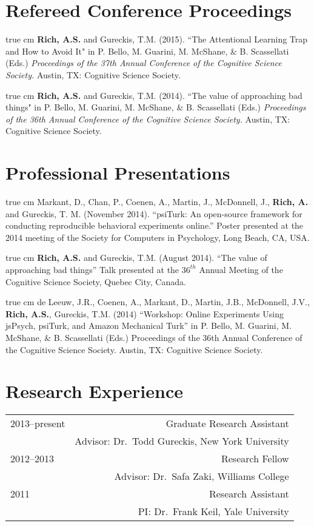 \documentclass[12pt]{my_cv}
\def\ind{\hangindent=1 true cm\hangafter=1 \noindent}
\begin{document}
\section{Refereed Conference Proceedings}

\ind \textbf{Rich, A.S.} and Gureckis, T.M. (2015). ``The Attentional Learning Trap and How to Avoid It" in P. Bello, M. Guarini, M. McShane, \& B. Scassellati (Eds.) \emph{Proceedings of the 37th Annual Conference of the Cognitive Science Society.} Austin, TX: Cognitive Science Society.	

\ind \textbf{Rich, A.S.} and Gureckis, T.M. (2014). ``The value of approaching bad things" in P. Bello, M. Guarini, M. McShane, \& B. Scassellati (Eds.) \emph{Proceedings of the 36th Annual Conference of the Cognitive Science Society.} Austin, TX: Cognitive Science Society.	

\section{Professional Presentations}
\ind Markant, D., Chan, P., Coenen, A., Martin, J., McDonnell, J., \textbf{Rich, A.} and Gureckis, T. M. (November 2014). ``psiTurk: An open-source framework for conducting reproducible behavioral experiments online.'' Poster presented at the 2014 meeting of the Society for Computers in Psychology, Long Beach, CA, USA.

\ind \textbf{Rich, A.S.} and Gureckis, T.M. (August 2014). ``The value of approaching bad things'' Talk presented at the $36^{th}$ Annual Meeting of the Cognitive Science Society, Quebec City, Canada.

\ind de Leeuw, J.R., Coenen, A., Markant, D., Martin, J.B., McDonnell, J.V., \textbf{Rich, A.S.}, Gureckis, T.M. (2014) ``Workshop: Online Experiments Using jsPsych, psiTurk, and Amazon Mechanical Turk'' in P. Bello, M. Guarini, M. McShane, \& B. Scassellati (Eds.) Proceedings of the 36th Annual Conference of the Cognitive Science Society. Austin, TX: Cognitive Science Society.	

\section{Research Experience}
\begin{tabular}{L R}
2013--present& Graduate Research Assistant\\
&Advisor: Dr.\ Todd Gureckis, New York University\\[1ex]
2012--2013& Research Fellow\\
&Advisor: Dr.\ Safa Zaki, Williams College\\[1ex]
2011&Research Assistant\\
&PI: Dr.\ Frank Keil, Yale University\\
\end{tabular}
\end{document}
